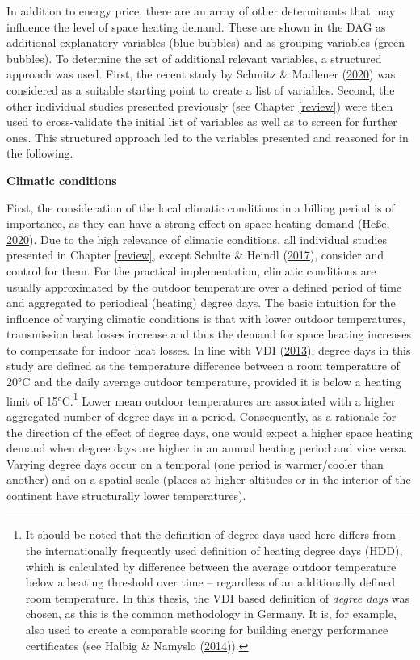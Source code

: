 \documentclass[12pt,twoside]{reedthesis}
\begin{document}
In addition to energy price, there are an array of other determinants that may influence the level of space heating demand. These are shown in the DAG as additional explanatory variables (blue bubbles) and as grouping variables (green bubbles). To determine the set of additional relevant variables, a structured approach was used. First, the recent study by Schmitz \& Madlener (\protect\hyperlink{ref-schmitz_madlener20}{2020}) was considered as a suitable starting point to create a list of variables. Second, the other individual studies presented previously (see Chapter \ref{review}) were then used to cross-validate the initial list of variables as well as to screen for further ones. This structured approach led to the variables presented and reasoned for in the following.

\textbf{Climatic conditions}

First, the consideration of the local climatic conditions in a billing period is of importance, as they can have a strong effect on space heating demand (\protect\hyperlink{ref-hesse20}{Heße, 2020}). Due to the high relevance of climatic conditions, all individual studies presented in Chapter \ref{review}, except Schulte \& Heindl (\protect\hyperlink{ref-schulte_heindl17}{2017}), consider and control for them. For the practical implementation, climatic conditions are usually approximated by the outdoor temperature over a defined period of time and aggregated to periodical (heating) degree days. The basic intuition for the influence of varying climatic conditions is that with lower outdoor temperatures, transmission heat losses increase and thus the demand for space heating increases to compensate for indoor heat losses. In line with VDI (\protect\hyperlink{ref-vdi13}{2013}), degree days in this study are defined as the temperature difference between a room temperature of 20°C and the daily average outdoor temperature, provided it is below a heating limit of 15°C.\footnote{It should be noted that the definition of degree days used here differs from the internationally frequently used definition of heating degree days (HDD), which is calculated by difference between the average outdoor temperature below a heating threshold over time -- regardless of an additionally defined room temperature. In this thesis, the VDI based definition of \emph{degree days} was chosen, as this is the common methodology in Germany. It is, for example, also used to create a comparable scoring for building energy performance certificates (see Halbig \& Namyslo (\protect\hyperlink{ref-halbig_namyslo14}{2014})).} Lower mean outdoor temperatures are associated with a higher aggregated number of degree days in a period. Consequently, as a rationale for the direction of the effect of degree days, one would expect a higher space heating demand when degree days are higher in an annual heating period and vice versa. Varying degree days occur on a temporal (one period is warmer/cooler than another) and on a spatial scale (places at higher altitudes or in the interior of the continent have structurally lower temperatures).
\end{document}
